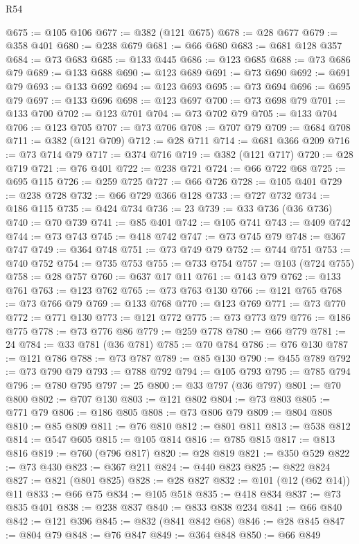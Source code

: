 \begin{lexlean}{R54}
\begin{coremodule}
@675 := @105 @106
@677 := @382 (@121 @675)
@678 := @28 @677
@679 := @358 @401
@680 := @238 @679
@681 := @66 @680
@683 := @681 @128 @357
@684 := @73 @683
@685 := @133 @445
@686 := @123 @685
@688 := @73 @686 @79
@689 := @133 @688
@690 := @123 @689
@691 := @73 @690
@692 := @691 @79
@693 := @133 @692
@694 := @123 @693
@695 := @73 @694
@696 := @695 @79
@697 := @133 @696
@698 := @123 @697
@700 := @73 @698 @79
@701 := @133 @700
@702 := @123 @701
@704 := @73 @702 @79
@705 := @133 @704
@706 := @123 @705
@707 := @73 @706
@708 := @707 @79
@709 := @684 @708
@711 := @382 (@121 @709)
@712 := @28 @711
@714 := @681 @366 @209
@716 := @73 @714 @79
@717 := @374 @716
@719 := @382 (@121 @717)
@720 := @28 @719
@721 := @76 @401
@722 := @238 @721
@724 := @66 @722 @68
@725 := @695 @115
@726 := @259 @725
@727 := @66 @726
@728 := @105 @401
@729 := @238 @728
@732 := @66 @729 @366 @128
@733 := @727 @732
@734 := @186 @115
@735 := @424 @734
@736 := 23
@739 := @33 @736 (@36 @736)
@740 := @70 @739
@741 := @85 @401
@742 := @105 @741
@743 := @409 @742
@744 := @73 @743
@745 := @418 @742
@747 := @73 @745 @79
@748 := @367 @747
@749 := @364 @748
@751 := @73 @749 @79
@752 := @744 @751
@753 := @740 @752
@754 := @735 @753
@755 := @733 @754
@757 := @103 (@724 @755)
@758 := @28 @757
@760 := @637 @17 @11
@761 := @143 @79
@762 := @133 @761
@763 := @123 @762
@765 := @73 @763 @130
@766 := @121 @765
@768 := @73 @766 @79
@769 := @133 @768
@770 := @123 @769
@771 := @73 @770
@772 := @771 @130
@773 := @121 @772
@775 := @73 @773 @79
@776 := @186 @775
@778 := @73 @776 @86
@779 := @259 @778
@780 := @66 @779
@781 := 24
@784 := @33 @781 (@36 @781)
@785 := @70 @784
@786 := @76 @130
@787 := @121 @786
@788 := @73 @787
@789 := @85 @130
@790 := @455 @789
@792 := @73 @790 @79
@793 := @788 @792
@794 := @105 @793
@795 := @785 @794
@796 := @780 @795
@797 := 25
@800 := @33 @797 (@36 @797)
@801 := @70 @800
@802 := @707 @130
@803 := @121 @802
@804 := @73 @803
@805 := @771 @79
@806 := @186 @805
@808 := @73 @806 @79
@809 := @804 @808
@810 := @85 @809
@811 := @76 @810
@812 := @801 @811
@813 := @538 @812
@814 := @547 @605
@815 := @105 @814
@816 := @785 @815
@817 := @813 @816
@819 := @760 (@796 @817)
@820 := @28 @819
@821 := @350 @529
@822 := @73 @430
@823 := @367 @211
@824 := @440 @823
@825 := @822 @824
@827 := @821 (@801 @825)
@828 := @28 @827
@832 := @101 (@12 (@62 @14)) @11
@833 := @66 @75
@834 := @105 @518
@835 := @418 @834
@837 := @73 @835 @401
@838 := @238 @837
@840 := @833 @838 @234
@841 := @66 @840
@842 := @121 @396
@845 := @832 (@841 @842 @68)
@846 := @28 @845
@847 := @804 @79
@848 := @76 @847
@849 := @364 @848
@850 := @66 @849

\end{coremodule}
\end{lexlean}
